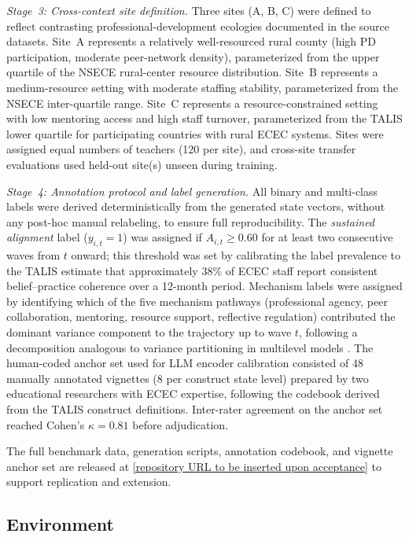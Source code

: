 \documentclass[pdflatex,sn-mathphys-num]{sn-jnl}%
\theoremstyle{thmstyleone}%
\theoremstyle{thmstyletwo}%
\theoremstyle{thmstylethree}%
\begin{document}
\textit{Stage~3: Cross-context site definition.} Three sites (A, B, C) were defined to reflect contrasting professional-development ecologies documented in the source datasets. Site~A represents a relatively well-resourced rural county (high PD participation, moderate peer-network density), parameterized from the upper quartile of the NSECE rural-center resource distribution. Site~B represents a medium-resource setting with moderate staffing stability, parameterized from the NSECE inter-quartile range. Site~C represents a resource-constrained setting with low mentoring access and high staff turnover, parameterized from the TALIS lower quartile for participating countries with rural ECEC systems. Sites were assigned equal numbers of teachers (120 per site), and cross-site transfer evaluations used held-out site(s) unseen during training.

\textit{Stage~4: Annotation protocol and label generation.} All binary and multi-class labels were derived deterministically from the generated state vectors, without any post-hoc manual relabeling, to ensure full reproducibility. The \emph{sustained alignment} label ($y_{i,t} = 1$) was assigned if $A_{i,t} \ge 0.60$ for at least two consecutive waves from $t$ onward; this threshold was set by calibrating the label prevalence to the TALIS estimate that approximately 38\% of ECEC staff report consistent belief--practice coherence over a 12-month period. Mechanism labels were assigned by identifying which of the five mechanism pathways (professional agency, peer collaboration, mentoring, resource support, reflective regulation) contributed the dominant variance component to the trajectory up to wave $t$, following a decomposition analogous to variance partitioning in multilevel models \cite{desimone2009impact}. The human-coded anchor set used for LLM encoder calibration consisted of 48 manually annotated vignettes (8 per construct state level) prepared by two educational researchers with ECEC expertise, following the codebook derived from the TALIS construct definitions. Inter-rater agreement on the anchor set reached Cohen's $\kappa = 0.81$ before adjudication.

The full benchmark data, generation scripts, annotation codebook, and vignette anchor set are released at \url{[repository URL to be inserted upon acceptance]} to support replication and extension.

\subsection{Environment}
\end{document}
